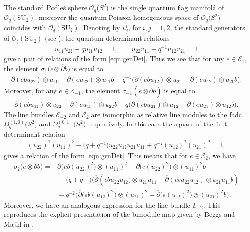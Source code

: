 \documentclass[pdftex]{sigma}
\numberwithin{equation}{section}
\newcommand\adel{\overline{\partial}}
\begin{document}
The standard Podle\'s sphere $\mathcal{O}_q\big(S^2\big)$ is the single quantum flag manifold of $\mathcal{O}_q(\mathrm{SU}_2)$, moreover the quantum Poisson homogeneous space of $\mathcal{O}_q\big(S^2\big)$ coincides with $\mathcal{O}_q(\mathrm{SU}_2)$. Denoting by $u^i_j$, for $i,j = 1,2$, the standard generators of $\mathcal{O}_q(\mathrm{SU}_2)$ (see \cite[Section~4.1]{KSLeabh}), the quantum determinant relations
\begin{gather*}
u_{11}u_{22} - qu_{21}u_{12} = 1, \qquad u_{22}u_{11} - q^{-1}u_{12}u_{21} = 1
\end{gather*}
give a pair of relations of the form \eqref{eqn:genDet}. Thus we see that for any $e \in \mathcal{E}_1$, the element $\sigma_1\big(e \otimes \adel b\big)$ is equal to
\begin{gather*}
\adel(ebu_{22}) \otimes u_{11}- \adel(eu_{22}) \otimes u_{11} b - q^{-1} \big(\adel(ebu_{12}) \otimes u_{21}-\adel(eu_{12}) \otimes u_{21}b\big).
\end{gather*}
Moreover, for any $e \in \mathcal{E}_{-1}$, the element $\sigma_{-1}(e \otimes \adel b)$ is equal to
\begin{gather*}
\adel(ebu_{11}) \otimes u_{22}-\adel(eu_{11}) \otimes u_{22}b - q\big( \adel(ebu_{21}) \otimes u_{12}- \adel(eu_{21}) \otimes u_{12}b\big).
\end{gather*}
The line bundles $\mathcal{E}_{-2}$ and $\mathcal{E}_{2}$ are isomorphic as relative line modules to the fodc $\Omega^{(1,0)}_q\big(S^2\big)$ and $\Omega^{(0,1)}_q\big(S^2\big)$ respectively. In this case the square of the first determinant relation
\begin{gather*}
(u_{22})^2(u_{11})^2-\big(q+q^{-1}\big)u_{22}u_{12}u_{21}u_{11}+q^{-2}(u_{12})^2(u_{21})^2=1,
\end{gather*}
gives a relation of the form \eqref{eqn:genDet}. This means that for $e \in \mathcal{E}_2$, we have
\begin{align*}
\sigma_2\big(e \otimes \adel b\big) ={} & \adel\big(eb(u_{22})^2\big) \otimes (u_{11})^2 -\adel\big(e(u_{22})^2\big) \otimes (u_{11})^2b
\\&{}- \big(q+q^{-1}\big)\big(\adel(ebu_{22}u_{12}\big) \otimes u_{21}u_{11} -\adel(ebu_{22}u_{12}) \otimes u_{21}u_{11}b)
\\&{} - q^{-2} \big(\adel\big(eb(u_{12})^2\big)\otimes (u_{21})^2-\adel\big(e(u_{12})^2\big) \otimes (u_{21})^2b\big).
\end{align*}
Moreover, we have an analogous expression for the line bundle $\mathcal{E}_{-2}$.
This reproduces the explicit presentation of the bimodule map given by Beggs and Majid in \cite[example 5.51]{BeggsMajid:Leabh}.
\end{document}

